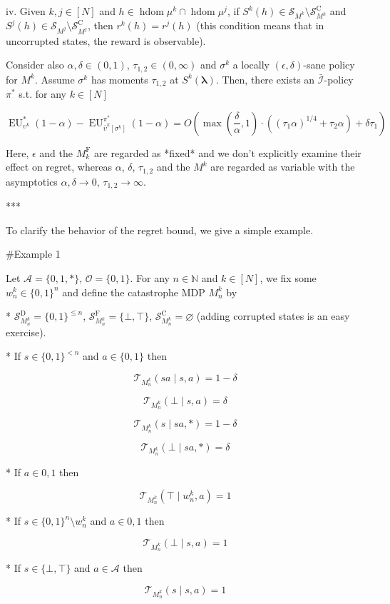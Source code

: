 \documentclass[a4paper]{article}
\newcommand{\Bool}{\{0,1\}}
\newcommand{\AP}[1]{\left(#1\right)}
\newcommand{\AB}[1]{\left[#1\right]}
\newcommand{\Nats}{\mathbb{N}}
\newcommand{\Estr}{\boldsymbol{\lambda}}
\newcommand{\Ob}{\mathcal{O}}
\newcommand{\A}{\mathcal{A}}
\newcommand{\St}{\mathcal{S}}
\newcommand{\T}{\mathcal{T}}
\newcommand{\In}{\mathcal{I}}
\newcommand{\Adi}{{\bar{\In}}}
\DeclareMathOperator{\HD}{hdom}
\newcommand{\RMC}{\mathrm{C}}
\newcommand{\RMD}{\mathrm{D}}
\newcommand{\RMF}{\mathrm{F}}
\newcommand{\SF}{\St^{\RMF}}
\newcommand{\SD}{\St^{\RMD}}
\newcommand{\SC}{\St^{\RMC}}
\newcommand{\MF}{M^{\RMF}}
\newcommand{\EU}{\operatorname{EU}}
\begin{document}
iv. Given $k,j \in [N]$ and $h \in \HD{\mu^k} \cap \HD{\mu^j}$, if $S^k(h) \in \St_{M^k} \setminus \SC_{M^k}$ and $S^j(h) \in \St_{M^j} \setminus \SC_{M^j}$, then $r^k(h)=r^j(h)$ (this condition means that in uncorrupted states, the reward is observable).

Consider also $\alpha,\delta\in(0,1)$, $\tau_{1,2} \in (0,\infty)$ and $\sigma^k$ a locally $(\epsilon,\delta)$-sane policy for $M^k$. Assume $\sigma^k$ has moments $\tau_{1,2}$ at $S^k(\Estr)$. Then, there exists an $\Adi$-policy $\pi^*$ s.t. for any $k \in [N]$

$$\EU_{\upsilon^k}^*(1-\alpha) - \EU_{\bar{\upsilon}^k\AB{\sigma^k}}^{\pi^*}(1-\alpha) = O\AP{\max\AP{\frac{\delta}{\alpha},1}\cdot\AP{(\tau_1 \alpha)^{1/4} + \tau_2 \alpha}+\delta\tau_1}$$

Here, $\epsilon$ and the $\MF_k$ are regarded as *fixed* and we don't explicitly examine their effect on regret, whereas $\alpha$, $\delta$, $\tau_{1,2}$ and the $M^k$ are regarded as variable with the asymptotics $\alpha,\delta \rightarrow 0$, $\tau_{1,2} \rightarrow \infty$.

***

To clarify the behavior of the regret bound, we give a simple example.

\#Example 1

Let $\A = \{0,1,*\}$, $\Ob=\Bool$. For any $n \in \Nats$ and $k \in [N]$, we fix some $w_n^k \in \Bool^n$ and define the catastrophe MDP $M_n^k$ by

* $\SD_{M_n^k} = \Bool^{\leq n}$, $\SF_{M_n^k} = \{\bot,\top\}$, $\SC_{M_n^k} = \varnothing$ (adding corrupted states is an easy exercise).

* If $s \in \Bool^{< n}$ and $a \in \Bool$ then 

$$\T_{M_n^k}(sa \mid s,a) = 1 - \delta$$

$$\T_{M_n^k}(\bot \mid s,a) = \delta$$

$$\T_{M_n^k}(s \mid sa,*) = 1 - \delta$$

$$\T_{M_n^k}(\bot \mid sa,*) = \delta$$

* If $a \in {0,1}$ then

$$\T_{M_n^k}(\top \mid w_n^k,a) = 1$$

* If $s \in \Bool^n \setminus w_n^k$ and $a \in {0,1}$ then

$$\T_{M_n^k}(\bot \mid s,a) = 1$$

* If $s \in \{\bot,\top\}$ and $a \in \A$ then

$$\T_{M_n^k}(s \mid s,a) = 1$$
\end{document}
